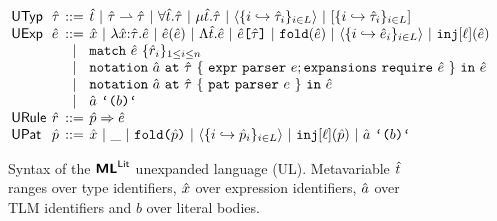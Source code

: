 \documentclass[acmsmall,screen]{acmart}
\makeatletter
\renewcommand{\subsubsection}{%
  \@startsection{subsubsection}{3}%
  {\z@}{1ex \@plus .2ex \@minus .2ex}{-1em}%
  {\sffamily\normalsize\itshape\maybe@addperiod}%
}
\newcommand{\maybe@addperiod}[1]{%
  #1\@addpunct{.}%
}
\makeatother
\begin{document}
\begin{figure}[t!]
\begin{minipage}{\textwidth}
\small
$\arraycolsep=2pt\begin{array}{llcl}
\mathsf{UTyp} & \utau & ::= & 
\ut ~\vert~ 
\parr{\utau}{\utau} ~\vert~
\forallt{\ut}{\utau} ~\vert~
\rect{\ut}{\utau} ~\vert~
\prodt{\mapschema{\utau}{i}{\labelset}} ~\vert~
\sumt{\mapschema{\utau}{i}{\labelset}}\\
\mathsf{UExp} & \ue & ::= & 
\ux ~\vert~
\lam{\ux}{\utau}{\ue} ~\vert~
\ap{\ue}{\ue} ~\vert~
\Lam{\ut}{\ue} ~\vert~
\App{\ue}{\utau} ~\vert~
\fold{\ue} ~\vert~
\tpl{\mapschema{\ue}{i}{\labelset}} ~\vert~
\inj{\ell}{\ue} \\
& & \vert & 
\matchwith{\ue}{\seqschemaX{\urv}}
 \\
& & \vert & \uesyntaxq{\tsmv}{\utau}{e}{\ue} \\   
& & \vert & \usyntaxup{\tsmv}{\utau}{e}{\ue} \\
&&\vert&  \utsmap{\tsmv}{b} \\
\mathsf{URule} & \urv & ::= & 
\matchrule{\upv}{\ue} \\
\mathsf{UPat} & \upv & ::= & 
\ux ~\vert~
\wildp ~\vert~ 
\foldp{\upv} ~\vert~
\tplp{\mapschema{\upv}{i}{\labelset}} ~\vert~
\injp{\ell}{\upv} ~\vert~
\utsmap{\tsmv}{b}

\end{array}$
\end{minipage}
\caption[Syntax of the $\miniVersePat$ unexpanded language (UL)]{Syntax of the $\miniVersePat$ unexpanded language (UL). Metavariable $\ut$ ranges over type identifiers, $\ux$ over expression identifiers, $\tsmv$ over TLM identifiers and $b$ over literal bodies. 
}
\label{fig:U-unexpanded-terms}
\end{figure}
\end{document}
